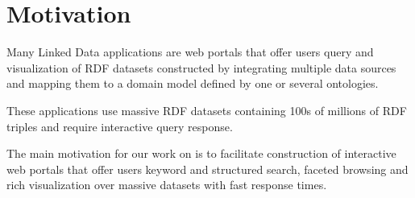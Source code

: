 \section{Motivation}
\label{sec:motivation}

Many Linked Data applications are web portals that offer users query and visualization of RDF datasets constructed by integrating multiple data sources and mapping them to a domain model defined by one or several ontologies.

These applications use massive RDF datasets containing 100s of millions of RDF triples and require interactive query response.


The main motivation for our work on \ldviews is to facilitate construction of interactive web portals that offer users keyword and structured search, faceted browsing and rich visualization over massive datasets with fast response times.
